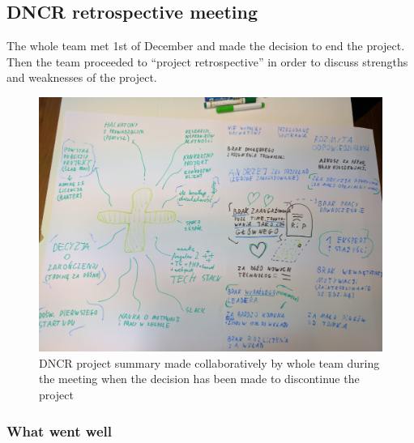 \documentclass{article}
\begin{document}
\subsection{DNCR retrospective meeting}
The whole team met 1st of December and made the decision to end the project. Then the team proceeded to ``project retrospective'' in order to discuss strengths and weaknesses of the project.

\begin{figure}[h]
    \includegraphics[width=\textwidth]{dncr-funeral}
    \caption{DNCR project summary made collaboratively by whole team during the meeting when the decision has been made to discontinue the project}
    \label{fig:dncr-funeral}
\end{figure}
\FloatBarrier

\subsubsection{What went well}
\end{document}
